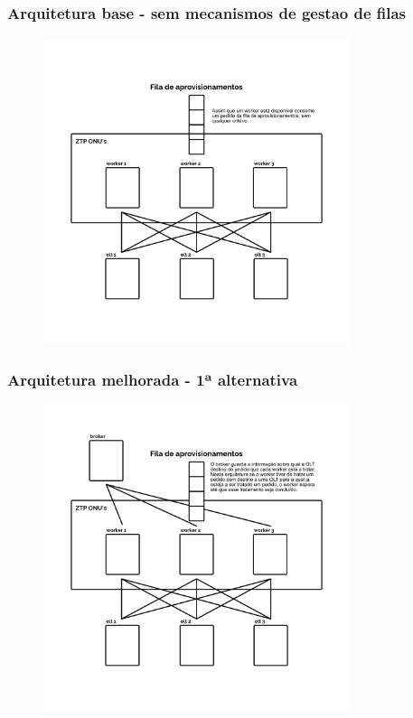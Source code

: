 \begin{frame}
    \frametitle{Arquitetura base - sem mecanismos de gestao de filas}
    \begin{figure}
        \includegraphics[width=0.8\textwidth]{./assets/gestao_de_filas/arquitetura_algoritmo_1.png}
    \end{figure}    
\end{frame}

\begin{frame}
    \frametitle{Arquitetura melhorada - 1ª alternativa}
    \begin{figure}
        \includegraphics[width=0.8\textwidth]{./assets/gestao_de_filas/arquitetura_algoritmo_2.png}
    \end{figure}    
\end{frame}

